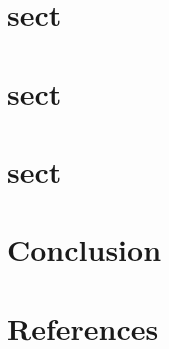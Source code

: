 \documentclass[final, paper=letter,5p,times,twocolumn]{elsarticle}
\begin{document}
\section{sect}

\section{sect}

\section{sect}


\section{Conclusion}

\section*{References}



\end{document}
